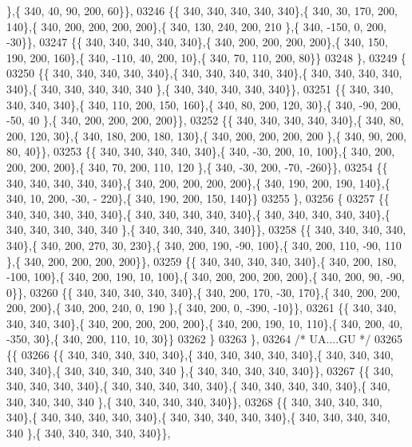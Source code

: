 \begin{DoxyCode}
      \},\{ 340,  40,  90, 200,  60\}\},
03246 \{\{ 340, 340, 340, 340, 340\},\{ 340,  30, 170, 200, 140\},\{ 340, 200, 200, 200, 200\},\{ 340, 130, 240, 200, 210
      \},\{ 340, -150,   0, 200, -30\}\},
03247 \{\{ 340, 340, 340, 340, 340\},\{ 340, 200, 200, 200, 200\},\{ 340, 150, 190, 200, 160\},\{ 340, -110,  40, 200,  
      10\},\{ 340,  70, 110, 200,  80\}\}
03248 \},
03249 \{
03250 \{\{ 340, 340, 340, 340, 340\},\{ 340, 340, 340, 340, 340\},\{ 340, 340, 340, 340, 340\},\{ 340, 340, 340, 340, 340
      \},\{ 340, 340, 340, 340, 340\}\},
03251 \{\{ 340, 340, 340, 340, 340\},\{ 340, 110, 200, 150, 160\},\{ 340,  80, 200, 120,  30\},\{ 340, -90, 200, -50,  40
      \},\{ 340, 200, 200, 200, 200\}\},
03252 \{\{ 340, 340, 340, 340, 340\},\{ 340,  80, 200, 120,  30\},\{ 340, 180, 200, 180, 130\},\{ 340, 200, 200, 200, 200
      \},\{ 340,  90, 200,  80,  40\}\},
03253 \{\{ 340, 340, 340, 340, 340\},\{ 340, -30, 200,  10, 100\},\{ 340, 200, 200, 200, 200\},\{ 340,  70, 200, 110, 120
      \},\{ 340, -30, 200, -70, -260\}\},
03254 \{\{ 340, 340, 340, 340, 340\},\{ 340, 200, 200, 200, 200\},\{ 340, 190, 200, 190, 140\},\{ 340,  10, 200, -30, -
      220\},\{ 340, 190, 200, 150, 140\}\}
03255 \},
03256 \{
03257 \{\{ 340, 340, 340, 340, 340\},\{ 340, 340, 340, 340, 340\},\{ 340, 340, 340, 340, 340\},\{ 340, 340, 340, 340, 340
      \},\{ 340, 340, 340, 340, 340\}\},
03258 \{\{ 340, 340, 340, 340, 340\},\{ 340, 200, 270,  30, 230\},\{ 340, 200, 190, -90, 100\},\{ 340, 200, 110, -90, 110
      \},\{ 340, 200, 200, 200, 200\}\},
03259 \{\{ 340, 340, 340, 340, 340\},\{ 340, 200, 180, -100, 100\},\{ 340, 200, 190,  10, 100\},\{ 340, 200, 200, 200, 
      200\},\{ 340, 200,  90, -90,   0\}\},
03260 \{\{ 340, 340, 340, 340, 340\},\{ 340, 200, 170, -30, 170\},\{ 340, 200, 200, 200, 200\},\{ 340, 200, 240,   0, 190
      \},\{ 340, 200,   0, -390, -10\}\},
03261 \{\{ 340, 340, 340, 340, 340\},\{ 340, 200, 200, 200, 200\},\{ 340, 200, 190,  10, 110\},\{ 340, 200,  40, -350,  
      30\},\{ 340, 200, 110,  10,  30\}\}
03262 \}
03263 \},
03264 \textcolor{comment}{/* UA....GU */}
03265 \{\{
03266 \{\{ 340, 340, 340, 340, 340\},\{ 340, 340, 340, 340, 340\},\{ 340, 340, 340, 340, 340\},\{ 340, 340, 340, 340, 340
      \},\{ 340, 340, 340, 340, 340\}\},
03267 \{\{ 340, 340, 340, 340, 340\},\{ 340, 340, 340, 340, 340\},\{ 340, 340, 340, 340, 340\},\{ 340, 340, 340, 340, 340
      \},\{ 340, 340, 340, 340, 340\}\},
03268 \{\{ 340, 340, 340, 340, 340\},\{ 340, 340, 340, 340, 340\},\{ 340, 340, 340, 340, 340\},\{ 340, 340, 340, 340, 340
      \},\{ 340, 340, 340, 340, 340\}\},

\end{DoxyCode}
